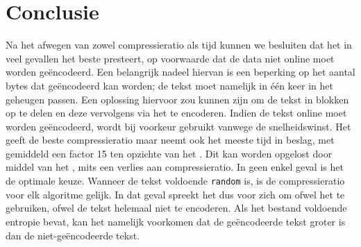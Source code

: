 \chapter{Conclusie}

Na het afwegen van zowel compressieratio als tijd kunnen we besluiten dat het \huffstd in veel gevallen het beste presteert, op voorwaarde dat de data niet online moet worden ge\"encodeerd. Een belangrijk nadeel hiervan is een beperking op het aantal bytes dat ge\"encodeerd kan worden; de tekst moet namelijk in één keer in het geheugen passen. Een oplossing hiervoor zou kunnen zijn om de tekst in blokken op te delen en deze vervolgens via het \huffstd te encoderen. Indien de tekst online moet worden ge\"encodeerd, wordt bij voorkeur \huffadap gebruikt vanwege de snelheidswinst. Het \huffslid geeft de beste compressieratio maar neemt ook het meeste tijd in beslag, met gemiddeld een factor 15 ten opzichte van het \huffstd. Dit kan worden opgelost door middel van het \huffblock, mits een verlies aan compressieratio. In geen enkel geval is het \hufftwopass de optimale keuze. Wanneer de tekst voldoende \texttt{random} is, is de compressieratio voor elk algoritme gelijk. In dat geval spreekt het dus voor zich om ofwel het \huffstd te gebruiken, ofwel de tekst helemaal niet te encoderen. Als het bestand voldoende entropie bevat, kan het namelijk voorkomen dat de ge\"encodeerde tekst groter is dan de niet-ge\"encodeerde tekst.